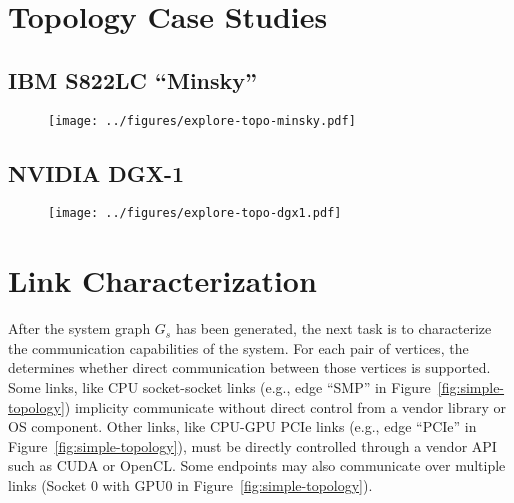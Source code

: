 \section{Topology Case Studies}

\subsection{IBM S822LC ``Minsky''}
\label{sec:topology-minsky}
\begin{figure}[h]
    \centering
    \texttt{[image: ../figures/explore-topo-minsky.pdf]}
    \caption[]{}
    \label{fig:actual-perf}
\end{figure}

\subsection{NVIDIA DGX-1}
\label{sec:topology-dgx1}

\begin{figure}[h]
    \centering
    \texttt{[image: ../figures/explore-topo-dgx1.pdf]}
    \caption[]{}
    \label{fig:actual-perf}
\end{figure}


%
%
\section{Link Characterization}
\label{sec:link-char}

After the system graph $G_s$ has been generated, the next task is to characterize the communication capabilities of the system.
For each pair of vertices, the  determines whether direct communication between those vertices is supported.
Some links, like CPU socket-socket links (e.g., edge ``SMP'' in Figure~\ref{fig:simple-topology}) implicity communicate without direct control from a vendor library or OS component.
Other links, like CPU-GPU PCIe links (e.g., edge ``PCIe'' in Figure~\ref{fig:simple-topology}), must be directly controlled through a vendor API such as CUDA or OpenCL.
Some endpoints may also communicate over multiple links (Socket 0 with GPU0 in Figure~\ref{fig:simple-topology}).


